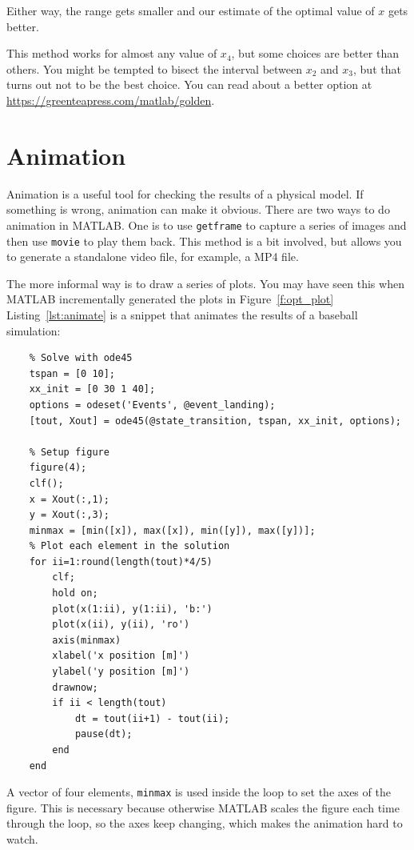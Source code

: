Either way, the range gets smaller and our estimate of the optimal value of $x$ gets better.

This method works for almost any value of $x_4$, but some choices
are better than others.  You might be tempted to bisect the interval between $x_2$ and $x_3$, but that turns out not to be the best choice.  You can read about a better option at \url{https://greenteapress.com/matlab/golden}.

\section{Animation}

Animation is a useful tool for checking the results of a physical model. If something is wrong, animation can make it obvious. There are two ways to do animation in MATLAB. One is to use \lstinline{getframe} to capture a series of images and then use \lstinline{movie} to play them back.  This method is a bit involved, but allows you to generate a standalone video file, for example, a MP4 file.


The more informal way is to draw a series of plots.  You may have seen this when MATLAB incrementally generated the plots in Figure~\ref{f:opt_plot}  Listing~\ref{lst:animate} is a snippet that animates the results of a baseball simulation:

\begin{lstlisting}[caption={A snippet that animates the results of a baseball simulation}, label={lst:animate}]
    % Animate
    % Solve with ode45
    tspan = [0 10];
    xx_init = [0 30 1 40];
    options = odeset('Events', @event_landing);
    [tout, Xout] = ode45(@state_transition, tspan, xx_init, options);
    
    % Setup figure
    figure(4);
    clf();
    x = Xout(:,1);
    y = Xout(:,3);
    minmax = [min([x]), max([x]), min([y]), max([y])];
    % Plot each element in the solution
    for ii=1:round(length(tout)*4/5)
        clf; 
        hold on;
        plot(x(1:ii), y(1:ii), 'b:')
        plot(x(ii), y(ii), 'ro')
        axis(minmax)
        xlabel('x position [m]')
        ylabel('y position [m]')
        drawnow;
        if ii < length(tout)
            dt = tout(ii+1) - tout(ii);
            pause(dt);
        end
    end
\end{lstlisting}

A vector of four elements, \lstinline{minmax} is used inside the loop to set the axes of the figure.
This is necessary because otherwise MATLAB scales the figure each time through the loop,
so the axes keep changing, which makes the animation hard to watch.

